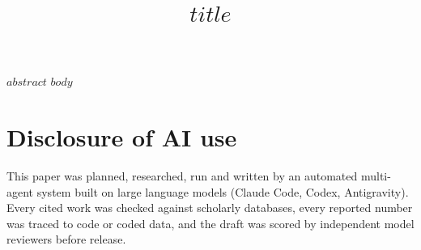 \documentclass[conference]{IEEEtran}
\begin{document}
\title{$title$}
\author{}
\maketitle
$abstract$
$body$

\section*{Disclosure of AI use}
This paper was planned, researched, run and written by an automated multi-agent system built on large
language models (Claude Code, Codex, Antigravity). Every cited work was checked against scholarly databases, every
reported number was traced to code or coded data, and the draft was scored by independent model
reviewers before release.
\clearpage{}\label{refsstart}


\label{lastpage}
\end{document}
